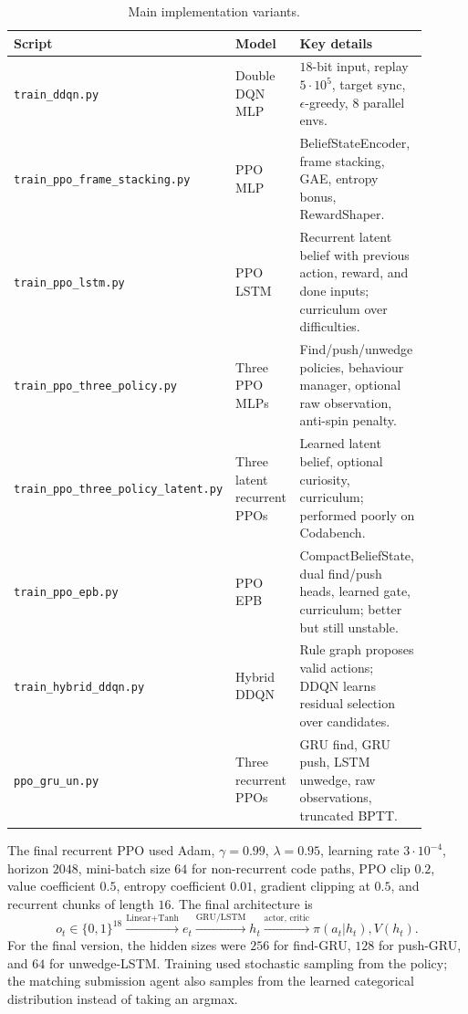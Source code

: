\documentclass[11pt, oneside]{article}
\begin{document}
\begin{table}[H]
\centering
\caption{Main implementation variants.}
\begin{tabular}{p{0.20\linewidth}p{0.29\linewidth}p{0.41\linewidth}}
\toprule
Script & Model & Key details \\
\midrule
\texttt{train\_ddqn.py} & Double DQN MLP & \(18\)-bit input, replay \(5\cdot10^5\), target sync, \(\epsilon\)-greedy, 8 parallel envs. \\
\texttt{train\_ppo\_frame\_stacking.py} & PPO MLP & BeliefStateEncoder, frame stacking, GAE, entropy bonus, RewardShaper. \\
\texttt{train\_ppo\_lstm.py} & PPO LSTM & Recurrent latent belief with previous action, reward, and done inputs; curriculum over difficulties. \\
\texttt{train\_ppo\_three\_policy.py} & Three PPO MLPs & Find/push/unwedge policies, behaviour manager, optional raw observation, anti-spin penalty. \\
\texttt{train\_ppo\_three\_policy\_latent.py} & Three latent recurrent PPOs & Learned latent belief, optional curiosity, curriculum; performed poorly on Codabench. \\
\texttt{train\_ppo\_epb.py} & PPO EPB & CompactBeliefState, dual find/push heads, learned gate, curriculum; better but still unstable. \\
\texttt{train\_hybrid\_ddqn.py} & Hybrid DDQN & Rule graph proposes valid actions; DDQN learns residual selection over candidates. \\
\texttt{ppo\_gru\_un.py} & Three recurrent PPOs & GRU find, GRU push, LSTM unwedge, raw observations, truncated BPTT. \\
\bottomrule
\end{tabular}
\end{table}

The final recurrent PPO used Adam, \(\gamma=0.99\), \(\lambda=0.95\), learning rate \(3\cdot10^{-4}\), horizon \(2048\), mini-batch size \(64\) for non-recurrent code paths, PPO clip \(0.2\), value coefficient \(0.5\), entropy coefficient \(0.01\), gradient clipping at \(0.5\), and recurrent chunks of length \(16\). The final architecture is
\[
o_t \in \{0,1\}^{18}
\xrightarrow{\text{Linear+Tanh}}
e_t
\xrightarrow{\mathrm{GRU/LSTM}}
h_t
\xrightarrow{\text{actor, critic}}
\pi(a_t|h_t), V(h_t).
\]
For the final version, the hidden sizes were \(256\) for find-GRU, \(128\) for push-GRU, and \(64\) for unwedge-LSTM. Training used stochastic sampling from the policy; the matching submission agent also samples from the learned categorical distribution instead of taking an argmax.
\end{document}
